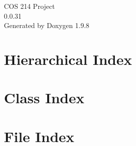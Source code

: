 \documentclass[twoside]{book}
\newcommand{\+}{\discretionary{\mbox{\scriptsize$\hookleftarrow$}}{}{}}
\newcommand{\clearemptydoublepage}{%
    \newpage{\pagestyle{empty}\cleardoublepage}%
  }
\begin{document}
  \raggedbottom
    \hypersetup{pageanchor=false,
                bookmarksnumbered=true,
                pdfencoding=unicode
               }
  \begin{titlepage}
  \vspace*{7cm}
  \begin{center}%
  {\Large COS 214 Project}\\
  [1ex]\large 0.\+0.\+31 \\
  \vspace*{1cm}
  {\large Generated by Doxygen 1.9.8}\\
  \end{center}
  \end{titlepage}
  \clearemptydoublepage
  \tableofcontents
  \clearemptydoublepage
  \hypersetup{pageanchor=true}
\chapter{Hierarchical Index}

\chapter{Class Index}

\chapter{File Index}

\end{document}
